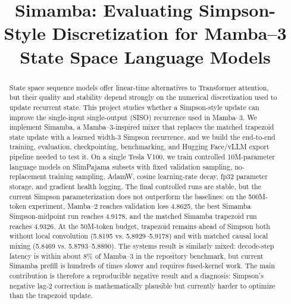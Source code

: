 \documentclass[conference]{IEEEtran}
\newcommand{\modelname}{Simamba\xspace}
\newcommand{\mambatwo}{Mamba--2\xspace}
\newcommand{\mambathree}{Mamba--3\xspace}
\begin{document}
\title{\modelname: Evaluating Simpson-Style Discretization for Mamba--3 State Space Language Models}

\author{
}

\maketitle

\begin{abstract}
State space sequence models offer linear-time alternatives to Transformer attention, but their quality and stability depend strongly on the numerical discretization used to update recurrent state. This project studies whether a Simpson-style update can improve the single-input single-output (SISO) recurrence used in \mambathree. We implement \modelname, a \mambathree-inspired mixer that replaces the matched trapezoid state update with a learned width-3 Simpson recurrence, and we build the end-to-end training, evaluation, checkpointing, benchmarking, and Hugging Face/vLLM export pipeline needed to test it. On a single Tesla V100, we train controlled 10M-parameter language models on SlimPajama subsets with fixed validation sampling, no-replacement training sampling, AdamW, cosine learning-rate decay, fp32 parameter storage, and gradient health logging. The final controlled runs are stable, but the current Simpson parameterization does not outperform the baselines: on the 500M-token experiment, \mambatwo reaches validation loss 4.8625, the best \modelname Simpson-midpoint run reaches 4.9178, and the matched \modelname trapezoid run reaches 4.9326. At the 50M-token budget, trapezoid remains ahead of Simpson both without local convolution (5.8195 vs. 5.8929--5.9178) and with matched causal local mixing (5.8469 vs. 5.8793--5.8890). The systems result is similarly mixed: decode-step latency is within about 8\% of \mambathree in the repository benchmark, but current \modelname prefill is hundreds of times slower and requires fused-kernel work. The main contribution is therefore a reproducible negative result and a diagnosis: Simpson's negative lag-2 correction is mathematically plausible but currently harder to optimize than the trapezoid update.
\end{abstract}
\end{document}
